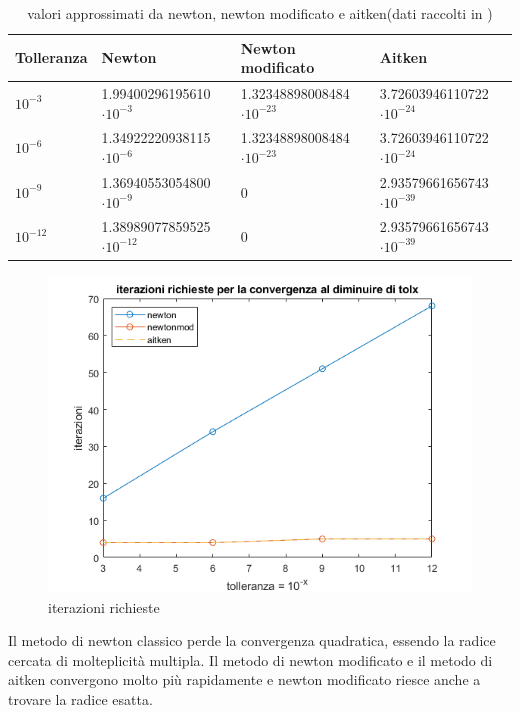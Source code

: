 \begin{table}[h]
    \renewcommand\arraystretch{2}
    \begin{tabular}{|l l l l|}
        \hline
        Tolleranza & Newton                          & Newton modificato               & Aitken                          \\
        \hline
        $10^{-3}$  & 1.99400296195610$\cdot10^{-3}$  & 1.32348898008484$\cdot10^{-23}$ & 3.72603946110722$\cdot10^{-24}$ \\
        $10^{-6}$  & 1.34922220938115$\cdot10^{-6}$  & 1.32348898008484$\cdot10^{-23}$ & 3.72603946110722$\cdot10^{-24}$ \\
        $10^{-9}$  & 1.36940553054800$\cdot10^{-9}$  & 0                               & 2.93579661656743$\cdot10^{-39}$ \\
        $10^{-12}$ & 1.38989077859525$\cdot10^{-12}$ & 0                               & 2.93579661656743$\cdot10^{-39}$ \\
        \hline
    \end{tabular}
    \caption{valori approssimati da newton, newton modificato e aitken(dati raccolti in )}
    \label{tab:7}
\end{table}
\newpage
\begin{figure}[h]
    \includegraphics[scale=0.7]{capitolo2/iter2.png}
    \caption{iterazioni richieste}
    \label{fig:es7}
\end{figure}
Il metodo di newton classico perde la convergenza quadratica, essendo la radice cercata di molteplicità multipla. Il metodo di newton modificato e il metodo di aitken convergono
molto più rapidamente e newton modificato riesce anche a trovare la radice esatta.